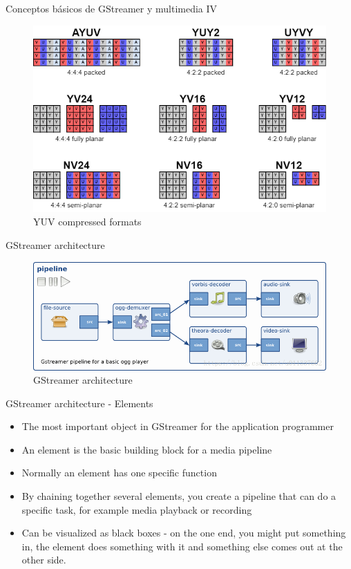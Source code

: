 \documentclass{beamer}
\begin{document}
\begin{frame}{Conceptos básicos de GStreamer y multimedia IV}
  \begin{figure}
    \includegraphics[width=1\textwidth]{formats.png}
    \caption{YUV compressed formats}
  \end{figure}
\end{frame}

\begin{frame}{GStreamer architecture}
  \begin{figure}
    \includegraphics[width=1\textwidth]{gst-architecture.png}
    \caption{GStreamer architecture}
  \end{figure}
\end{frame}

\begin{frame}{GStreamer architecture - Elements}
\begin{itemize}
  \item The most important object in GStreamer for the application programmer
  \item An element is the basic building block for a media pipeline
  \item Normally an element has one specific function
  \item By chaining together several elements, you create a pipeline that can do a specific task, for example media playback or recording
  \item Can be visualized as black boxes - on the one end, you might put something in, the element does something with it and something else comes out at the other side.
\end{itemize}
\end{frame}
\end{document}
